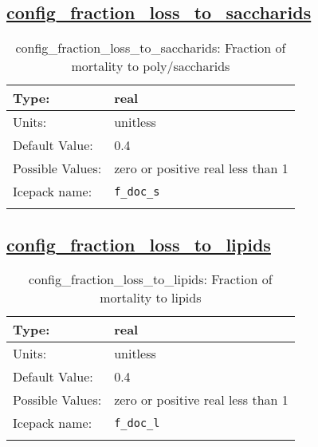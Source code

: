 \subsection[config\_fraction\_loss\_to\_saccharids]{\hyperref[sec:nm_tab_biogeochemistry]{config\_fraction\_loss\_to\_saccharids}}
\label{subsec:nm_sec_config_fraction_loss_to_saccharids}
\begin{center}
\begin{longtable}{| p{2.0in} || p{4.0in} |}
    \hline
    Type: & real \\
    \hline
    Units: & \si{unitless} \\
    \hline
    Default Value: & 0.4 \\
    \hline
    Possible Values: & zero or positive real less than 1 \\
    \hline
    \hline
    Icepack name: & \verb+f_doc_s+ \\
    \caption{config\_fraction\_loss\_to\_saccharids: Fraction of mortality to poly/saccharids}
\end{longtable}
\end{center}
\subsection[config\_fraction\_loss\_to\_lipids]{\hyperref[sec:nm_tab_biogeochemistry]{config\_fraction\_loss\_to\_lipids}}
\label{subsec:nm_sec_config_fraction_loss_to_lipids}
\begin{center}
\begin{longtable}{| p{2.0in} || p{4.0in} |}
    \hline
    Type: & real \\
    \hline
    Units: & \si{unitless} \\
    \hline
    Default Value: & 0.4 \\
    \hline
    Possible Values: & zero or positive real less than 1 \\
    \hline
    \hline
    Icepack name: & \verb+f_doc_l+ \\
    \caption{config\_fraction\_loss\_to\_lipids: Fraction of mortality to lipids}
\end{longtable}
\end{center}

